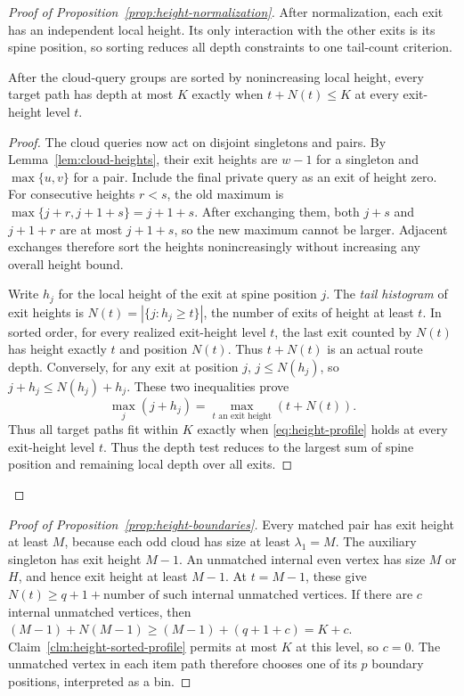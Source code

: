 \begin{proof}[Proof of Proposition~\ref{prop:height-normalization}]
After normalization, each exit has an independent local height.
Its only interaction with the other exits is its spine position,
so sorting reduces all depth constraints to one tail-count criterion.

\begin{claim}
\label{clm:height-sorted-profile}
After the cloud-query groups are sorted by nonincreasing local
height, every target path has depth at most $K$ exactly when
$t+N(t)\le K$ at every exit-height level $t$.
\end{claim}
\begin{proof}
The cloud queries now act on disjoint singletons and pairs.
By Lemma~\ref{lem:cloud-heights}, their exit heights are $w-1$
for a singleton and $\max\{u,v\}$
for a pair. Include the final private query as an exit of height
zero. For consecutive heights $r<s$, the old maximum is
$\max\{j+r,j+1+s\}=j+1+s$. After exchanging them,
both $j+s$ and $j+1+r$ are at most $j+1+s$, so the new maximum
cannot be larger. Adjacent exchanges therefore sort the heights
nonincreasingly without increasing any overall height bound.

Write $h_j$ for the local height of the exit at spine position $j$.
The \emph{tail histogram} of exit heights is
$N(t)=|\{j:h_j\ge t\}|$, the number of exits of height at least $t$.
In sorted order, for every realized exit-height level $t$,
the last exit counted by $N(t)$ has height exactly $t$ and position
$N(t)$. Thus $t+N(t)$ is an actual route depth. Conversely, for
any exit at position $j$, $j\le N(h_j)$, so
$j+h_j\le N(h_j)+h_j$. These two inequalities prove
\[
 \max_j(j+h_j)=\max_{t\text{ an exit height}}(t+N(t)).
\] Thus all target paths fit within $K$ exactly when
\eqref{eq:height-profile} holds at every exit-height level $t$.
Thus the depth test reduces to the largest sum of spine position and
remaining local depth over all exits.
\end{proof}
\end{proof}

\begin{proof}[Proof of Proposition~\ref{prop:height-boundaries}]
Every matched pair has exit height at least $M$, because each odd
cloud has size at least $\lambda_1=M$. The auxiliary singleton has exit
height $M-1$. An unmatched internal even vertex has size $M$ or $H$,
and hence exit height at least $M-1$.
At $t=M-1$, these give
$N(t)\ge q+1+\text{number of such internal unmatched vertices}$.
If there are $c$ internal unmatched vertices, then
$(M-1)+N(M-1)\ge(M-1)+(q+1+c)=K+c$.
Claim~\ref{clm:height-sorted-profile} permits at most $K$ at this
level, so $c=0$.
The unmatched vertex in each item path therefore chooses one of
its $p$ boundary positions, interpreted as a bin.
\end{proof}

